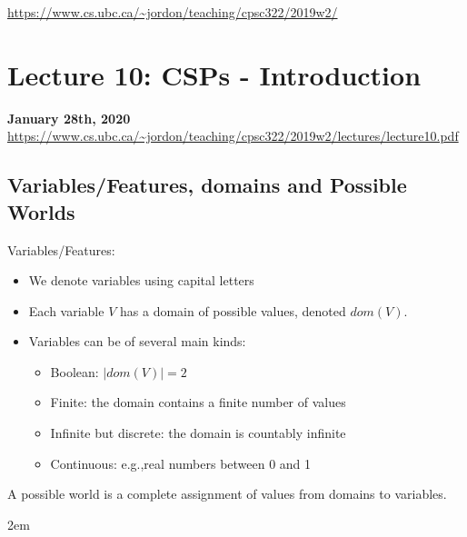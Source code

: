 \documentclass{article}
\def\blu#1{{\color{blu}#1}}
\theoremstyle{definition}
\begin{document}
\noindent \url{https://www.cs.ubc.ca/~jordon/teaching/cpsc322/2019w2/}

\section*{Lecture 10: CSPs - Introduction}
\textbf{January 28th, 2020} \\
\url{https://www.cs.ubc.ca/~jordon/teaching/cpsc322/2019w2/lectures/lecture10.pdf}


\subsection*{Variables/Features, domains and Possible Worlds}
Variables/Features:
\begin{itemize}
	\item We denote variables using capital letters
	\item Each variable $ V $ has a \blu{domain} of possible values, denoted $ dom(V) $. 
	\item Variables can be of several main kinds:
	\begin{itemize}
		\item \blu{Boolean}: $ |dom(V)| = 2 $
		\item \blu{Finite}: the domain contains a finite number of values
		\item \blu{Infinite but discrete}: the domain is countably infinite
		\item \blu{Continuous}: e.g.,real numbers between 0 and 1
	\end{itemize}
\end{itemize}
A possible world is a complete assignment of values from domains to variables. 

\begingroup
\leftskip 2em
\end{document}
